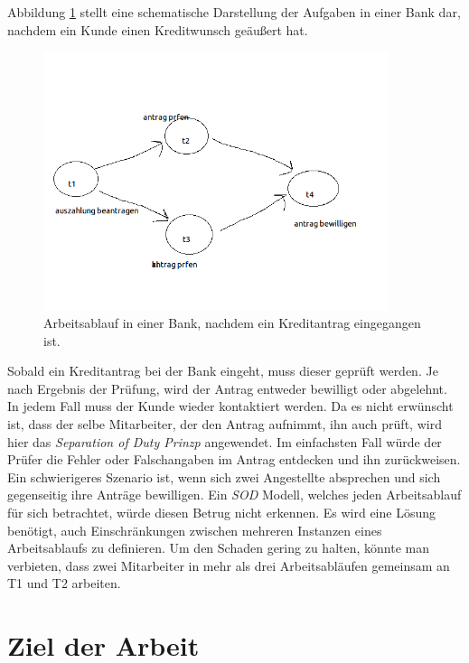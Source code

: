 Abbildung \ref{fig:WorkflowEinleitung} stellt eine schematische Darstellung der Aufgaben in einer Bank dar, nachdem ein Kunde einen Kreditwunsch geäußert hat.

\begin{figure}[ht]
	\centering
  \includegraphics[width=0.9\textwidth]{Figures/Workflow}
	\caption{Arbeitsablauf in einer Bank, nachdem ein Kreditantrag eingegangen ist.}
	\label{fig:WorkflowEinleitung}
\end{figure}

Sobald ein Kreditantrag bei der Bank eingeht, muss dieser geprüft werden. Je nach Ergebnis der Prüfung, wird der Antrag entweder bewilligt oder abgelehnt. In jedem Fall muss der Kunde wieder kontaktiert werden.
Da es nicht erwünscht ist, dass der selbe Mitarbeiter, der den Antrag aufnimmt, ihn auch prüft, wird hier das \textit{Separation of Duty Prinzp} angewendet. Im einfachsten Fall würde der Prüfer die Fehler oder Falschangaben im Antrag entdecken und ihn zurückweisen. Ein schwierigeres Szenario ist, wenn sich zwei Angestellte absprechen und sich gegenseitig ihre Anträge bewilligen. Ein \textit{SOD} Modell, welches jeden Arbeitsablauf für sich betrachtet, würde diesen Betrug nicht erkennen. Es wird eine Lösung benötigt, auch Einschränkungen zwischen mehreren Instanzen eines Arbeitsablaufs zu definieren. Um den Schaden gering zu halten, könnte man verbieten, dass zwei Mitarbeiter in mehr als drei Arbeitsabläufen gemeinsam an T1 und T2 arbeiten.




\section{Ziel der Arbeit}

